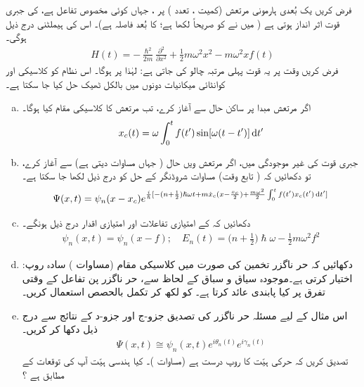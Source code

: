 فرض کریں یک بُعدی ہارمونی مرتعش (کمیت ، تعدد ) پر ، جہاں  کوئی مخصوص تفاعل ہے، کی جبری قوت اثر انداز ہوتی ہے ( میں نے  کو صریحاً لکھا ہے؛  کا بُعد فاصلہ ہے)۔ اس کی ہیملٹنی درج ذیل ہوگی۔
\begin{align}
H(t) = - \frac{\hslash^2}{2m} \frac{\partial^2}{\partial x^2} + \frac{1}{2} m \omega^2 x^2 - m \omega^2 x f (t)
\end{align}
فرض کریں وقت  پر یہ قوت پہلی مرتبہ چالو کی جاتی ہے: لہٰذا  پر  ہوگا۔ اس نظام کو کلاسیکی اور کوانٹائی میکانیات دونوں میں بالکل ٹھیک حل کیا جا سکتا ہے۔ 
\begin{enumerate}[a.]
\item
اگر مرتعش مبدا پر ساکن حال  سے آغاز کرے، تب مرتعش کا کلاسیکی مقام کیا ہوگا۔  
\begin{align}\label{مساوات_حر_کلاسیکی_مقام}
x_c (t) = \omega \int_0^{t} f(t') \sin [\omega (t - t')] \dif t'
\end{align}
\item
جبری قوت کی غیر موجودگی میں، اگر مرتعش  ویں حال (  جہاں  مساوات  دیتی ہے) سے آغاز کرے، تو دکھائیں کہ ( تابع وقت) مساوات شروڈنگر کے حل کو درج ذیل لکھا جا سکتا ہے۔ 
\begin{align}
\Psi (x, t) = \psi_n (x - x_c) e^{\frac{i}{\hslash} [- (n + \frac{1}{2}) \hslash \omega t + m \dot{x}_c (x - \frac{x_c}{2}) + \frac{m \omega^2}{2} \int_0^t f (t') x_c (t') \dif t']}
\end{align}
\item
دکھائیں کہ  کے امتیازی تفاعلات اور امتیازی اقدار درج ذیل ہونگے۔ 
\begin{align}
\psi_n (x, t) = \psi_n (x - f); \quad E_n (t) = \big ( n + \frac{1}{2} \big ) \hslash \omega - \frac{1}{2} m \omega^2 f^2
\end{align}
\item
دکھائیں کہ حر ناگزر تخمین کی صورت میں کلاسیکی مقام (مساوات ) سادہ روپ:  اختیار کرتی ہے۔موجودہ سیاق و سباق کے لحاظ سے، حر ناگزر پن تفاعل  کے وقتی تفرق پر کیا پابندی عائد کرتا ہے۔   کو  لکھ کر تکمل بالحصص استعمال کریں۔
\item
اس مثال کے لیے مسئلہ حر ناگزر کی تصدیق جزو-ج اور جزو-د کے نتائج سے درج ذیل دکھا کر کریں۔
\begin{align}
\Psi (x, t) \cong \psi_n (x, t) e^{i \theta_n (t)} e^{i \gamma_n (t)}
\end{align}
تصدیق کریں کہ حرکی ہیّت کا روپ درست ہے (مساوات )۔ کیا ہندسی ہیّت آپ کی توقعات کے مطابق ہے ؟
\end{enumerate}
